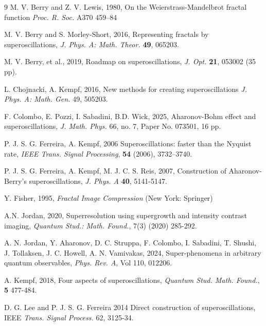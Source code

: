 \documentclass[reqno,11pt]{amsart}
\theoremstyle{definition}
\begin{document}
\begin{thebibliography}{9}
M. V. Berry and Z. V. Lewis, 1980, On the Weierstrass-Mandelbrot fractal function \textit{Proc. R. Soc.} A370 459--84


M. V. Berry and S. Morley-Short, 2016,
Representing fractals by superoscillations,
\textit{J. Phys. A: Math. Theor.} \textbf{49}, 065203.


M. V. Berry, et al., 2019,
Roadmap on superoscillations,
\textit{J. Opt.} \textbf{21}, 053002 (35 pp).


L. Chojnacki, A. Kempf, 2016, New methods for creating superoscillations \textit{J. Phys. A: Math. Gen.} 49, 505203.



 F. Colombo, E. Pozzi, I. Sabadini, B.D. Wick,
2025, Aharonov-Bohm effect and superoscillations,  {\em
  J. Math. Phys.} 66, no. 7, Paper No. 073501, 16 pp.




P. J. S. G. Ferreira, A. Kempf, 2006
Superoscillations: faster than the Nyquist rate,
{\em IEEE Trans. Signal Processing}, {\bf 54} (2006), 3732--3740.



 P. J. S. G. Ferreira, A. Kempf,  M. J. C. S. Reis, 2007,
 {Construction of Aharonov-Berry's superoscillations}, {\em J. Phys. A} {\bf 40},  5141-5147.

Y. Fisher, 1995, \textit{Fractal Image Compression} (New York: Springer)




 A.N. Jordan, 2020, Superresolution using supergrowth and intensity contrast imaging, {\em
 Quantum Stud.: Math. Found.}, 7(3) (2020) 285-292.


 A. N. Jordan, Y. Aharonov, D. C. Struppa, F. Colombo, I. Sabadini, T. Shushi,
 J. Tollaksen, J. C. Howell, A. N. Vamivakas, 2024,
    {Super-phenomena in arbitrary quantum observables},
 {\em Phys. Rev. A},  Vol 110, 012206.



A. Kempf, 2018,
{Four aspects of superoscillations},
 {\em Quantum Stud. Math. Found.}, {\bf 5}  477-484.



 D. G. Lee and P. J. S. G. Ferreira 2014 Direct construction of superoscillations, IEEE \textit{ Trans. Signal Process.} 62, 3125-34.



\end{thebibliography}
\end{document}
